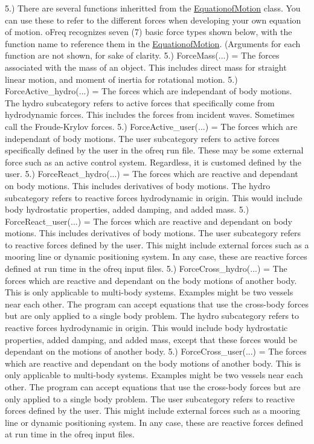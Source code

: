 5.) There are several functions inheritted from the \hyperlink{classosea_1_1ofreq_1_1_equationof_motion}{Equationof\-Motion} class. You can use these to refer to the different forces when developing your own equation of motion. o\-Freq recognizes seven (7) basic force types shown below, with the function name to reference them in the \hyperlink{classosea_1_1ofreq_1_1_equationof_motion}{Equationof\-Motion}. (Arguments for each function are not shown, for sake of clarity. 5.) Force\-Mass(...) = The forces associated with the mass of an object. This includes direct mass for straight linear motion, and moment of inertia for rotational motion. 5.) Force\-Active\-\_\-hydro(...) = The forces which are independant of body motions. The hydro subcategory refers to active forces that specifically come from hydrodynamic forces. This includes the forces from incident waves. Sometimes call the Froude-\/\-Krylov forces. 5.) Force\-Active\-\_\-user(...) = The forces which are independant of body motions. The user subcategory refers to active forces specifically defined by the user in the ofreq run file. These may be some external force such as an active control system. Regardless, it is customed defined by the user. 5.) Force\-React\-\_\-hydro(...) = The forces which are reactive and dependant on body motions. This includes derivatives of body motions. The hydro subcategory refers to reactive forces hydrodynamic in origin. This would include body hydrostatic properties, added damping, and added mass. 5.) Force\-React\-\_\-user(...) = The forces which are reactive and dependant on body motions. This includes derivatives of body motions. The user subcategory refers to reactive forces defined by the user. This might include external forces such as a mooring line or dynamic positioning system. In any case, these are reactive forces defined at run time in the ofreq input files. 5.) Force\-Cross\-\_\-hydro(...) = The forces which are reactive and dependant on the body motions of another body. This is only applicable to multi-\/body systems. Examples might be two vessels near each other. The program can accept equations that use the cross-\/body forces but are only applied to a single body problem. The hydro subcategory refers to reactive forces hydrodynamic in origin. This would include body hydrostatic properties, added damping, and added mass, except that these forces would be dependant on the motions of another body. 5.) Force\-Cross\-\_\-user(...) = The forces which are reactive and dependant on the body motions of another body. This is only applicable to multi-\/body systems. Examples might be two vessels near each other. The program can accept equations that use the cross-\/body forces but are only applied to a single body problem. The user subcategory refers to reactive forces defined by the user. This might include external forces such as a mooring line or dynamic positioning system. In any case, these are reactive forces defined at run time in the ofreq input files.

